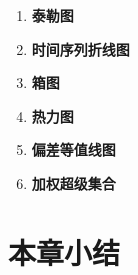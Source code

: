 


\begin{enumerate}[(1)]
\item \textbf{泰勒图}

\item \textbf{时间序列折线图}

\item \textbf{箱图}

\item \textbf{热力图}

\item \textbf{偏差等值线图}

\item \textbf{加权超级集合}

\end{enumerate}

\section{本章小结}


